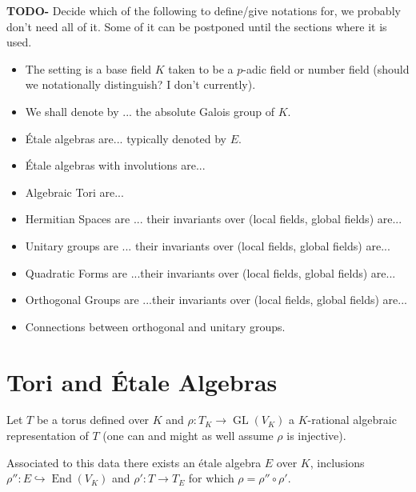 \documentclass{article}
\theoremstyle{plain}
\theoremstyle{definition}
\DeclareMathOperator{\End}{End}
\DeclareMathOperator{\GL}{GL}
\newcommand{\TODO}[1]{\textbf{TODO-#1}}
\begin{document}
\TODO{} Decide which of the following to define/give notations for, we probably don't need all of it. Some of it can be postponed until the sections where it is used.
\begin{itemize}
\item The setting is a base field $K$ taken to be a $p$-adic field or number field (should we notationally distinguish? I don't currently).
\item We shall denote by $...$ the absolute Galois group of $K$.
\item \'Etale algebras are... typically denoted by $E$.
\item \'Etale algebras with involutions are...
\item Algebraic Tori are... 
\item Hermitian Spaces are ... their invariants over (local fields, global fields) are...
\item Unitary groups are ... their invariants over (local fields, global fields) are...
\item Quadratic Forms are ...their invariants over (local fields, global fields) are...
\item Orthogonal Groups are ...their invariants over (local fields, global fields) are...
\item Connections between orthogonal and unitary groups.
\end{itemize}


\section{Tori and \'Etale Algebras}

Let $T$ be a torus defined over $K$ and $\rho:T_K \rightarrow \GL(V_K)$ a $K$-rational algebraic representation of $T$ (one can and might as well assume $\rho$ is injective).

Associated to this data there exists an \'etale algebra $E$ over $K$, inclusions $\rho'' : E \hookrightarrow \End(V_K)$ and $\rho' : T \rightarrow T_E$ for which $\rho = \rho''\circ\rho'$.
\end{document}
